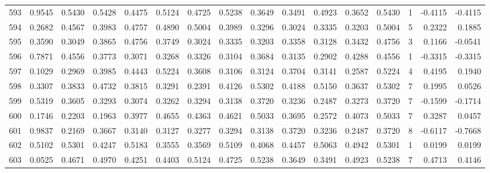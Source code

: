 \begin{tabular}{lrrrrrrrrrrrrrrr}
593 &      0.9545 &  0.5430 &  0.5428 &  0.4475 &  0.5124 &  0.4725 &  0.5238 &  0.3649 &  0.3491 &  0.4923 &   0.3652 &     0.5430 &      1 &                   -0.4115 &                    -0.4115 \\
594 &      0.2682 &  0.4567 &  0.3983 &  0.4757 &  0.4890 &  0.5004 &  0.3989 &  0.3296 &  0.3024 &  0.3335 &   0.3203 &     0.5004 &      5 &                    0.2322 &                     0.1885 \\
595 &      0.3590 &  0.3049 &  0.3865 &  0.4756 &  0.3749 &  0.3024 &  0.3335 &  0.3203 &  0.3358 &  0.3128 &   0.3432 &     0.4756 &      3 &                    0.1166 &                    -0.0541 \\
596 &      0.7871 &  0.4556 &  0.3773 &  0.3071 &  0.3268 &  0.3326 &  0.3104 &  0.3684 &  0.3135 &  0.2902 &   0.4288 &     0.4556 &      1 &                   -0.3315 &                    -0.3315 \\
597 &      0.1029 &  0.2969 &  0.3985 &  0.4443 &  0.5224 &  0.3608 &  0.3106 &  0.3124 &  0.3704 &  0.3141 &   0.2587 &     0.5224 &      4 &                    0.4195 &                     0.1940 \\
598 &      0.3307 &  0.3833 &  0.4732 &  0.3815 &  0.3291 &  0.2391 &  0.4126 &  0.5302 &  0.4188 &  0.5150 &   0.3637 &     0.5302 &      7 &                    0.1995 &                     0.0526 \\
599 &      0.5319 &  0.3605 &  0.3293 &  0.3074 &  0.3262 &  0.3294 &  0.3138 &  0.3720 &  0.3236 &  0.2487 &   0.3273 &     0.3720 &      7 &                   -0.1599 &                    -0.1714 \\
600 &      0.1746 &  0.2203 &  0.1963 &  0.3977 &  0.4655 &  0.4363 &  0.4621 &  0.5033 &  0.3695 &  0.2572 &   0.4073 &     0.5033 &      7 &                    0.3287 &                     0.0457 \\
601 &      0.9837 &  0.2169 &  0.3667 &  0.3140 &  0.3127 &  0.3277 &  0.3294 &  0.3138 &  0.3720 &  0.3236 &   0.2487 &     0.3720 &      8 &                   -0.6117 &                    -0.7668 \\
602 &      0.5102 &  0.5301 &  0.4247 &  0.5183 &  0.3555 &  0.3569 &  0.5109 &  0.4068 &  0.4457 &  0.5063 &   0.4942 &     0.5301 &      1 &                    0.0199 &                     0.0199 \\
603 &      0.0525 &  0.4671 &  0.4970 &  0.4251 &  0.4403 &  0.5124 &  0.4725 &  0.5238 &  0.3649 &  0.3491 &   0.4923 &     0.5238 &      7 &                    0.4713 &                     0.4146 \\

\end{tabular}
